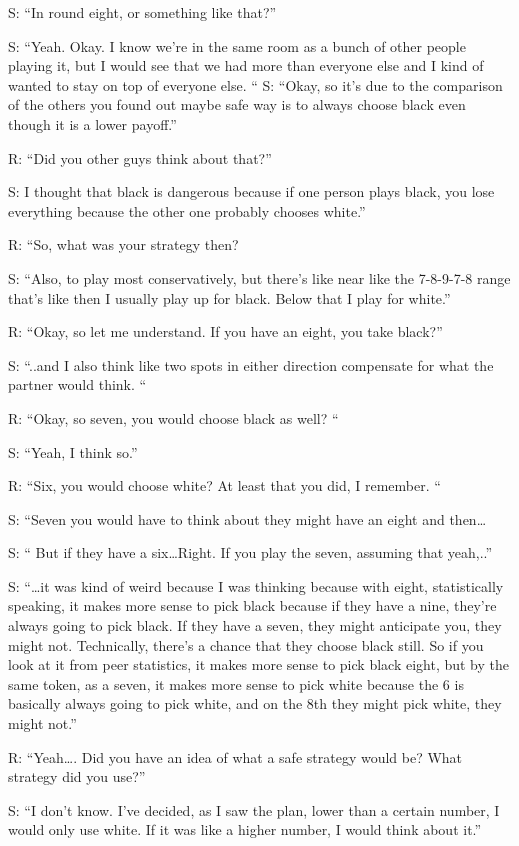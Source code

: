 S: “In round eight, or something like that?”

S: “Yeah. Okay. I know we're in the same room as a bunch of other people playing it, but I would see that we had more than everyone else and I kind of wanted to stay on top of everyone else. “
S: “Okay, so it's due to the comparison of the others you found out maybe safe way is to always choose black even though it is a lower payoff.”

R: “Did you other guys think about that?” 

S: I thought that black is dangerous because if one person plays black, you lose everything because the other one probably chooses white.”

R: “So, what was your strategy then? 

S: “Also, to play most conservatively, but there's like near like the 7-8-9-7-8 range that's like then I usually play up for black. Below that I play for white.” 

R: “Okay, so let me understand. If you have an eight, you take black?”

S: “..and I also think like two spots in either direction compensate for what the partner would think. “

R: “Okay, so seven, you would choose black as well? “

S: “Yeah, I think so.”

R: “Six, you would choose white? At least that you did, I remember. “

S: “Seven you would have to think about they might have an eight and then…

S: “ But if they have a six…Right. If you play the seven, assuming that yeah,..”

S: “…it was kind of weird because I was thinking because with eight, statistically speaking, it makes more sense to pick black because if they have a nine, they're always going to pick black. If they have a seven, they might anticipate you, they might not. Technically, there's a chance that they choose black still. So if you look at it from peer statistics, it makes more sense to pick black eight, but by the same token, as a seven, it makes more sense to pick white because the 6 is basically always going to pick white, and on the 8th they might pick white, they might not.”

R: “Yeah…. Did you have an idea of what a safe strategy would be? What strategy did you use?”

S: “I don't know. I've decided, as I saw the plan, lower than a certain number, I would only use white. If it was like a higher number, I would think about it.”

